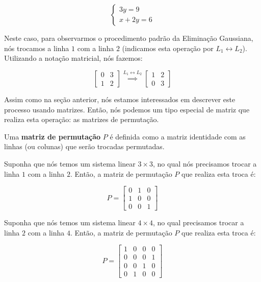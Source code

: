 $$
\begin{cases}
	3y = 9 \\
	x + 2y = 6
\end{cases}
$$

Neste caso, para observarmos o procedimento padrão da Eliminação Gaussiana, nós trocamos a linha $1$ com a linha $2$ (indicamos esta operação por $L_1\leftrightarrow L_2$). Utilizando a notação matricial, nós fazemos:

$$
\begin{bmatrix}
	0 & 3 \\
	1 & 2
\end{bmatrix}\overset{L_1\leftrightarrow L_2}{\implies} \begin{bmatrix}
	1 & 2 \\
	0 & 3
\end{bmatrix}
$$

Assim como na seção anterior, nós estamos interessados em descrever este processo usando matrizes. Então, nós podemos um tipo especial de matriz que realiza esta operação: as matrizes de permutação.

\begin{Definition}
	Uma \textbf{matriz de permutação} $P$ é definida como a matriz identidade com as linhas (ou colunas) que serão trocadas permutadas. 
\end{Definition}

\begin{Example}
	Suponha que nós temos um sistema linear $3\times 3$, no qual nós precisamos trocar a linha $1$ com a linha $2$. Então, a matriz de permutação $P$ que realiza esta troca é:
	
	$$
	P = \begin{bmatrix}
		0 & 1 & 0 \\
		1 & 0 & 0 \\
		0 & 0 & 1
	\end{bmatrix}
	$$
\end{Example}

\begin{Example}
	Suponha que nós temos um sistema linear $4\times 4$, no qual precisamos trocar a linha $2$ com a linha $4$. Então, a matriz de permutação $P$ que realiza esta troca é:
	
	$$
	P = \begin{bmatrix}
		1 & 0 & 0 & 0 \\
		0 & 0 & 0 & 1 \\
		0 & 0 & 1 & 0 \\
		0 & 1 & 0 & 0
	\end{bmatrix}
	$$
\end{Example}

